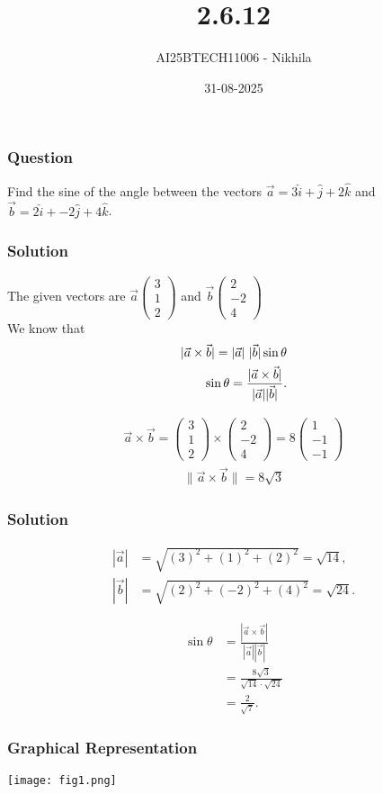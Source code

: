 \documentclass{beamer}
\title{2.6.12 }
\author{AI25BTECH11006 - Nikhila}
\date{31-08-2025}
\begin{document}
\frame{\titlepage}

\begin{frame}
\frametitle{Question}
Find the sine of the angle between the vectors $\vec{a} = 3\hat{i} + \hat{j} + 2\hat{k}$ and $\vec{b} = 2\hat{i} + -2\hat{j} + 4\hat{k}$.\\
 \end{frame}




\begin{frame}
\frametitle{Solution}
The given vectors are $\vec{a}\begin{pmatrix}3 \\ 1 \\ 2\end{pmatrix} $ and $  \vec{b}\begin{pmatrix}2 \\ -2 \\ 4\end{pmatrix}$ \\ 
 We know that 
\begin{align}
|\vec{a}\times\vec{b}| = |\vec{a}| \hspace{0.3em} |\vec{b}| \sin\theta \\
\sin\theta = \frac{|\vec{a}\times\vec{b}|}{|\vec{a}||\vec{b}|}.
\end{align}

\begin{align}
\vec{a} \times \vec{b} = 
\begin{pmatrix}
 3 \\ 1 \\ 2  
\end{pmatrix} \times \begin{pmatrix}
 2 \\ -2 \\ 4  
\end{pmatrix} = 8 \begin{pmatrix} 1 \\ -1 \\ -1 \end{pmatrix}
\end{align}
\begin{align}    
\lVert \vec{a}\times\vec{b} \rVert  =  8\sqrt{3}
\end{align}

\end{frame}


\begin{frame}
\frametitle{Solution}

\begin{align}
|\vec{a}| &= \sqrt{(3)^2 + (1)^2 + (2)^2} = \sqrt{14}, \\
|\vec{b}| &= \sqrt{(2)^2 + (-2)^2 + (4)^2} = \sqrt{24}.
\end{align}

\begin{align}
\sin\theta &= \frac{|\vec{a}\times \vec{b}|}{|\vec{a}||\vec{b}|} \\
&= \frac{8\sqrt{3}}{\sqrt{14}\cdot \sqrt{24}} \\
&= \frac{2}{\sqrt{7}}.
\end{align}

 \end{frame}


\begin{frame}
\frametitle{Graphical Representation}
\begin{center}
\texttt{[image: fig1.png]}
\end{center}
\end{frame}
\end{document}
